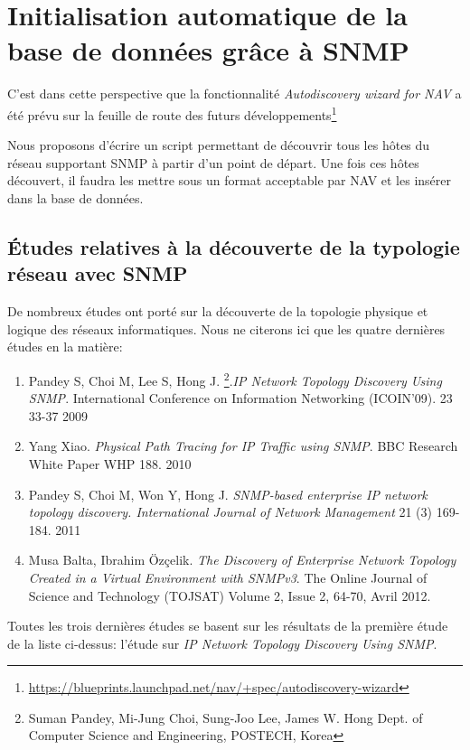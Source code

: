 \section{Initialisation automatique de la base de données grâce à SNMP}

C'est dans cette perspective que la fonctionnalité \emph{Autodiscovery wizard for NAV} a été prévu sur la feuille de route des futurs développements\footnote{\url{https://blueprints.launchpad.net/nav/+spec/autodiscovery-wizard}}


Nous proposons d'écrire un script permettant de découvrir tous les hôtes du réseau supportant SNMP à partir d'un point de départ. Une fois ces hôtes découvert, il faudra les mettre sous un format acceptable par NAV et les insérer dans la base de données.


\subsection{Études relatives à la découverte de la typologie réseau avec SNMP}
De nombreux études ont porté sur la découverte de la topologie physique et logique des réseaux informatiques. Nous ne citerons ici que les quatre dernières études en la matière:
\begin{enumerate}
\item Pandey S, Choi M, Lee S, Hong J. \footnote{
Suman Pandey, Mi-Jung Choi, Sung-Joo Lee, James W. Hong	Dept. of Computer Science and Engineering, POSTECH, Korea}.\emph{IP Network Topology Discovery Using SNMP}. International Conference on Information Networking (ICOIN'09). 23 33-37 2009 %
\item Yang Xiao. \emph{Physical Path Tracing for IP Traffic using SNMP}. BBC Research White Paper WHP 188. 2010 %
\item Pandey S, Choi M, Won Y, Hong J. \emph{SNMP-based enterprise IP network topology discovery. International Journal of Network Management} 21 (3) 169-184. 2011 %
\item Musa Balta, Ibrahim Özçelik. \emph{The Discovery of Enterprise Network Topology Created in a Virtual Environment with SNMPv3}. The Online Journal of Science and Technology (TOJSAT) Volume 2, Issue 2, 64-70, Avril 2012. %
\end{enumerate}
Toutes les trois dernières études se basent sur les résultats de la première étude de la liste ci-dessus: l'étude sur \emph{IP Network Topology Discovery Using SNMP}. 

